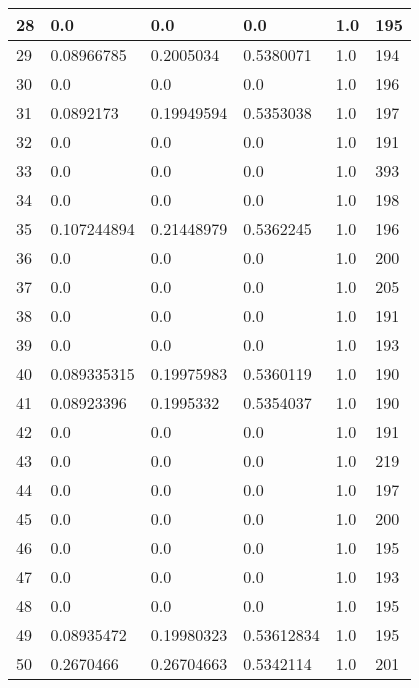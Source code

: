 \begin{longtable}{|l|l|l|l|l|l|}
28 & 0.0 & 0.0 & 0.0 & 1.0 & 195 \\ \hline 
29 & 0.08966785 & 0.2005034 & 0.5380071 & 1.0 & 194 \\ \hline 
30 & 0.0 & 0.0 & 0.0 & 1.0 & 196 \\ \hline 
31 & 0.0892173 & 0.19949594 & 0.5353038 & 1.0 & 197 \\ \hline 
32 & 0.0 & 0.0 & 0.0 & 1.0 & 191 \\ \hline 
33 & 0.0 & 0.0 & 0.0 & 1.0 & 393 \\ \hline 
34 & 0.0 & 0.0 & 0.0 & 1.0 & 198 \\ \hline 
35 & 0.107244894 & 0.21448979 & 0.5362245 & 1.0 & 196 \\ \hline 
36 & 0.0 & 0.0 & 0.0 & 1.0 & 200 \\ \hline 
37 & 0.0 & 0.0 & 0.0 & 1.0 & 205 \\ \hline 
38 & 0.0 & 0.0 & 0.0 & 1.0 & 191 \\ \hline 
39 & 0.0 & 0.0 & 0.0 & 1.0 & 193 \\ \hline 
40 & 0.089335315 & 0.19975983 & 0.5360119 & 1.0 & 190 \\ \hline 
41 & 0.08923396 & 0.1995332 & 0.5354037 & 1.0 & 190 \\ \hline 
42 & 0.0 & 0.0 & 0.0 & 1.0 & 191 \\ \hline 
43 & 0.0 & 0.0 & 0.0 & 1.0 & 219 \\ \hline 
44 & 0.0 & 0.0 & 0.0 & 1.0 & 197 \\ \hline 
45 & 0.0 & 0.0 & 0.0 & 1.0 & 200 \\ \hline 
46 & 0.0 & 0.0 & 0.0 & 1.0 & 195 \\ \hline 
47 & 0.0 & 0.0 & 0.0 & 1.0 & 193 \\ \hline 
48 & 0.0 & 0.0 & 0.0 & 1.0 & 195 \\ \hline 
49 & 0.08935472 & 0.19980323 & 0.53612834 & 1.0 & 195 \\ \hline 
50 & 0.2670466 & 0.26704663 & 0.5342114 & 1.0 & 201 \\ \hline 
\end{longtable}